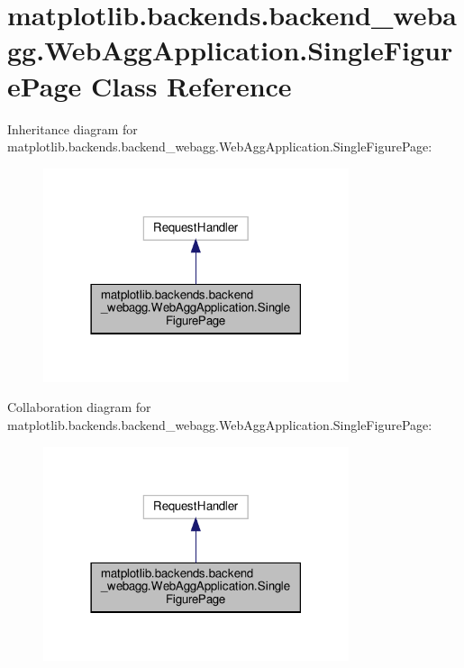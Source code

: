 \hypertarget{classmatplotlib_1_1backends_1_1backend__webagg_1_1WebAggApplication_1_1SingleFigurePage}{}\section{matplotlib.\+backends.\+backend\+\_\+webagg.\+Web\+Agg\+Application.\+Single\+Figure\+Page Class Reference}
\label{classmatplotlib_1_1backends_1_1backend__webagg_1_1WebAggApplication_1_1SingleFigurePage}


Inheritance diagram for matplotlib.\+backends.\+backend\+\_\+webagg.\+Web\+Agg\+Application.\+Single\+Figure\+Page\+:
\nopagebreak
\begin{figure}[H]
\begin{center}
\leavevmode
\includegraphics[width=254pt]{classmatplotlib_1_1backends_1_1backend__webagg_1_1WebAggApplication_1_1SingleFigurePage__inherit__graph}
\end{center}
\end{figure}


Collaboration diagram for matplotlib.\+backends.\+backend\+\_\+webagg.\+Web\+Agg\+Application.\+Single\+Figure\+Page\+:
\nopagebreak
\begin{figure}[H]
\begin{center}
\leavevmode
\includegraphics[width=254pt]{classmatplotlib_1_1backends_1_1backend__webagg_1_1WebAggApplication_1_1SingleFigurePage__coll__graph}
\end{center}
\end{figure}
